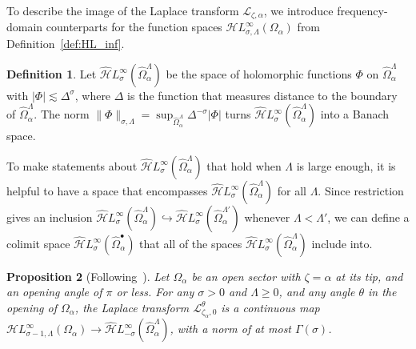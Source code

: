 \documentclass{article}
\newcommand{\singexp}[2]{\mathcal{H}L^\infty_{#1, #2}}
\newcommand{\dualsingexp}[1]{\widehat{\mathcal{H}}L^\infty_{#1}}
\newcommand{\laplace}{\mathcal{L}}
\theoremstyle{definition}
\newtheorem{definition}{Definition}[section]
\theoremstyle{plain}
\newtheorem{prop}[definition]{Proposition}
\begin{document}
To describe the image of the Laplace transform $\laplace_{\zeta,\alpha}$, we introduce frequency-domain counterparts for the function spaces $\singexp{\sigma}{\Lambda}(\Omega_\alpha)$ from Definition~\ref{def:HL_inf}.
%
\begin{definition}\label{def:H_hat}
Let $\dualsingexp{\sigma}(\widehat{\Omega}_\alpha^\Lambda)$ be the space of holomorphic functions $\Phi$ on $\widehat{\Omega}_\alpha^\Lambda$ with $|\Phi| \lesssim \Delta^\sigma$, where $\Delta$ is the function that measures distance to the boundary of $\widehat{\Omega}_\alpha^\Lambda$. The norm $\|\Phi\|_{\sigma, \Lambda} = \sup_{\widehat{\Omega}_\alpha^\Lambda} \Delta^{-\sigma} |\Phi|$ turns $\dualsingexp{\sigma}(\widehat{\Omega}_\alpha^\Lambda)$ into a Banach space.    
\end{definition}
To make statements about $\dualsingexp{\sigma}(\widehat{\Omega}_\alpha^\Lambda)$ that hold when $\Lambda$ is large enough, it is helpful to have a space that encompasses $\dualsingexp{\sigma}(\widehat{\Omega}_\alpha^\Lambda)$ for all $\Lambda$. Since restriction gives an inclusion $\dualsingexp{\sigma}(\widehat{\Omega}_\alpha^\Lambda) \hookrightarrow \dualsingexp{\sigma}(\widehat{\Omega}_\alpha^{\Lambda'})$ whenever $\Lambda < \Lambda'$, we can define a colimit space $\dualsingexp{\sigma}(\widehat{\Omega}_\alpha^\bullet)$ that all of the spaces $\dualsingexp{\sigma}(\widehat{\Omega}_\alpha^\Lambda)$ include into.
%
\begin{prop}[Following~\cite{sternin1995borel}]\label{prop:laplace-cont}
Let $\Omega_\alpha$ be an open sector with $\zeta = \alpha$ at its tip, and an opening angle of $\pi$ or less. For any $\sigma > 0$ and $\Lambda \ge 0$, and any angle $\theta$ in the opening of $\Omega_\alpha$, the Laplace transform $\laplace_{\zeta_\alpha, 0}^\theta$ is a continuous map $\singexp{\sigma-1}{\Lambda}(\Omega_\alpha) \to \dualsingexp{-\sigma}(\widehat{\Omega}_\alpha^\Lambda)$, with a norm of at most $\Gamma(\sigma)$.
\end{prop}
\end{document}
